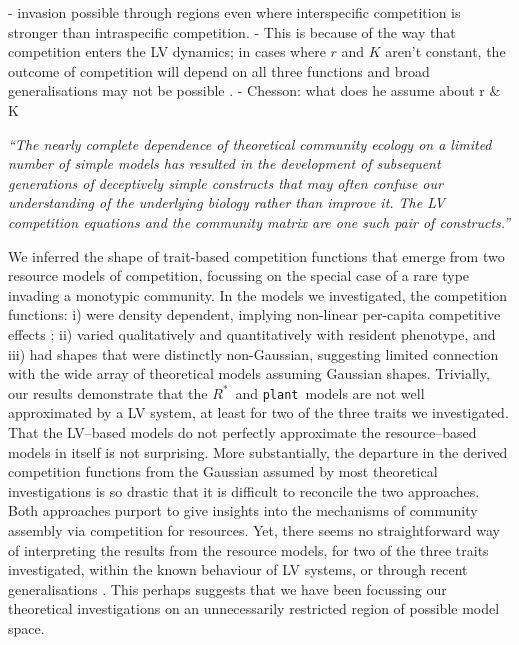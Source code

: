 \documentclass[a4paper,11pt]{article}
\newcommand{\Rstar}{\ensuremath{R^*}}
\newcommand{\plant}{{\tt plant}}
\begin{document}
- invasion possible through regions even where interspecific competition is stronger than intraspecific competition.
- This is because of the way that competition enters the LV dynamics; in cases where $r$ and $K$ aren't constant, the outcome of competition will depend on all three functions and broad generalisations may not be possible \citep[c.f.][]{Leimar-2013}.
- Chesson: what does he assume about r \& K



\emph{``The nearly complete dependence of theoretical community ecology on a limited number of simple models has resulted in the development of subsequent generations of deceptively simple constructs that may often confuse our understanding of the underlying biology rather than improve it. The
LV competition equations and the community matrix are one such pair of constructs.''} \citep{Neill-1974}

We inferred the shape of trait-based competition functions that emerge from two resource models of competition, focussing on the special case of a rare type invading a monotypic community. In the models we investigated, the competition functions: i) were density dependent, implying non-linear per-capita competitive effects \citep{Abrams-1980}; ii) varied qualitatively and quantitatively with resident phenotype, and iii) had shapes that were distinctly non-Gaussian, suggesting limited connection with the wide array of theoretical models assuming Gaussian shapes. Trivially, our results demonstrate that the \Rstar\ and \plant\ models are not well approximated by a LV system, at least for two of the three traits we investigated. That the LV--based models do not perfectly approximate the resource--based models in itself is not surprising. More substantially, the departure in the derived competition functions from the Gaussian assumed by most theoretical investigations is so drastic that it is difficult to reconcile the two approaches.
Both approaches purport to give insights into the mechanisms of community assembly via competition for resources.
Yet, there seems no straightforward way of interpreting the results from the resource models, for two of the three traits investigated, within the known behaviour of LV systems, or through recent generalisations \citep{Leimar-2013}. This perhaps suggests that we have been focussing our theoretical investigations on an unnecessarily restricted region of possible model space.
\end{document}
